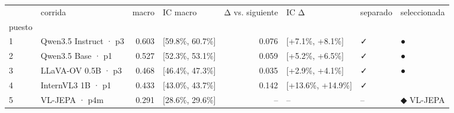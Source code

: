 \begin{tabular}{llrlrlll}
\toprule
 & corrida & macro & IC macro & Δ vs. siguiente & IC Δ & separado & seleccionada \\
puesto &  &  &  &  &  &  &  \\
\midrule
1 & Qwen3.5 Instruct · p3 & 0.603 & [59.8\%, 60.7\%] & 0.076 & [+7.1\%, +8.1\%] & ✓ & ● \\
2 & Qwen3.5 Base · p1 & 0.527 & [52.3\%, 53.1\%] & 0.059 & [+5.2\%, +6.5\%] & ✓ & ● \\
3 & LLaVA-OV 0.5B · p3 & 0.468 & [46.4\%, 47.3\%] & 0.035 & [+2.9\%, +4.1\%] & ✓ & ● \\
4 & InternVL3 1B · p1 & 0.433 & [43.0\%, 43.7\%] & 0.142 & [+13.6\%, +14.9\%] & ✓ &  \\
5 & VL-JEPA · p4m & 0.291 & [28.6\%, 29.6\%] & -- & -- & -- & ◆ VL-JEPA \\
\bottomrule
\end{tabular}
